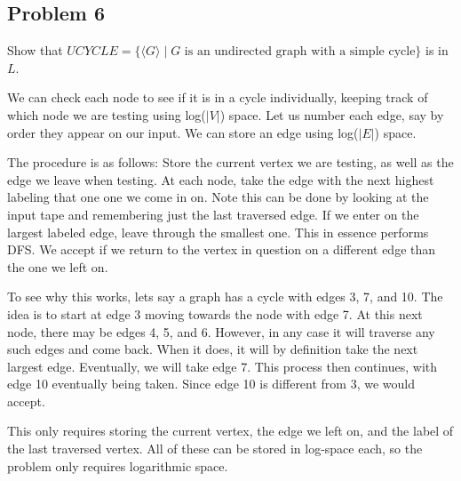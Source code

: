\documentclass[english]{article}
\begin{document}
\subsection*{Problem 6}
Show that $UCYCLE = \{ \langle G \rangle \mid G \textrm{ is an undirected graph with a simple cycle} \}$
is in $L$.

We can check each node to see if it is in a cycle individually, keeping track of which node we are
testing using log($|V|$) space. Let us number each edge, say by order they appear on our input.
We can store an edge using log($|E|$) space.

The procedure is as follows: Store the current vertex we are testing, as well as the edge we leave
when testing. At each node, take the edge with the next highest labeling that one one we come in on.
Note this can be done by looking at the input tape and remembering just the last traversed edge. If
we enter on the largest labeled edge, leave through the smallest one. This in essence performs DFS.
We accept if we return to the vertex in question on a different edge than the one we left on.

To see why this works, lets say a graph has a cycle with edges 3, 7, and 10. The idea is to start
at edge 3 moving towards the node with edge 7. At this next node, there may be edges 4, 5, and 6.
However, in any case it will traverse any such edges and come back. When it does, it will by
definition take the next largest edge. Eventually, we will take edge 7. This process then continues,
with edge 10 eventually being taken. Since edge 10 is different from 3, we would accept.

This only requires storing the current vertex, the edge we left on, and the label of the last
traversed vertex. All of these can be stored in log-space each, so the problem only requires
logarithmic space.
\end{document}

